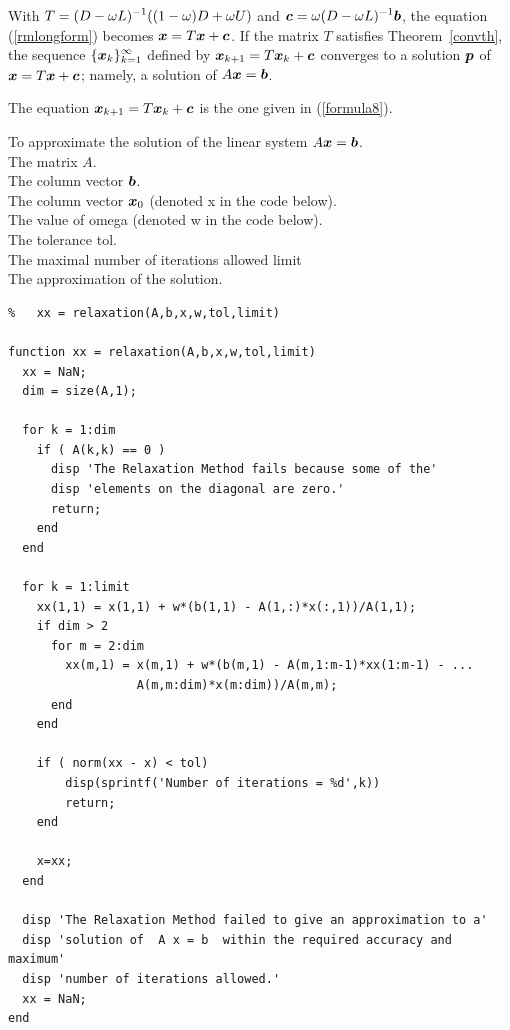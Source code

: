 With $\displaystyle T = (D-\omega L)^{-1}((1-\omega)D + \omega U)$ and
$\displaystyle \bm{c} = \omega (D-\omega L)^{-1}\bm{b}$, the equation
(\ref{rmlongform}) becomes $\bm{x} = T\bm{x} + \bm{c}$.  If the
matrix $T$ satisfies Theorem~\ref{convth}, the sequence
$\displaystyle \{\bm{x}_{k}\}_{k=1}^\infty$ defined by
$\bm{x}_{k+1} = T\bm{x}_k + \bm{c}$ converges to a solution
$\bm{p}$ of $\bm{x} = T\bm{x} + \bm{c}$; namely, a solution of
$A\bm{x} = \bm{b}$.

The equation $\bm{x}_{k+1} = T\bm{x}_k + \bm{c}$ is the one given in
(\ref{formula8}).

\begin{code}
To approximate the solution of the linear system $A \bm{x} = \bm{b}$.\\
 The matrix $A$.\\
The column vector $\bm{b}$.\\
The column vector $\bm{x}_0$ (denoted x in the code below).\\
The value of omega (denoted w in the code below).\\
The tolerance  tol.\\
The maximal number of iterations allowed  limit\\
 The approximation of the solution.
\small
\begin{verbatim}
%   xx = relaxation(A,b,x,w,tol,limit)

function xx = relaxation(A,b,x,w,tol,limit)
  xx = NaN;
  dim = size(A,1);

  for k = 1:dim
    if ( A(k,k) == 0 )
      disp 'The Relaxation Method fails because some of the'
      disp 'elements on the diagonal are zero.'
      return;
    end
  end

  for k = 1:limit
    xx(1,1) = x(1,1) + w*(b(1,1) - A(1,:)*x(:,1))/A(1,1);
    if dim > 2
      for m = 2:dim
        xx(m,1) = x(m,1) + w*(b(m,1) - A(m,1:m-1)*xx(1:m-1) - ...
                  A(m,m:dim)*x(m:dim))/A(m,m);
      end
    end

    if ( norm(xx - x) < tol)
        disp(sprintf('Number of iterations = %d',k))
        return;
    end
    
    x=xx;
  end

  disp 'The Relaxation Method failed to give an approximation to a'
  disp 'solution of  A x = b  within the required accuracy and maximum'
  disp 'number of iterations allowed.'
  xx = NaN;
end
\end{verbatim}
\end{code}

